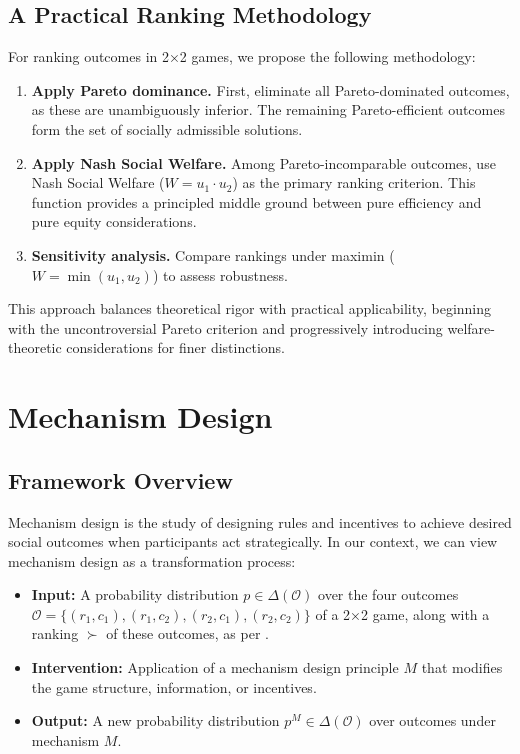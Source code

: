 \documentclass[11pt]{amsart}
\begin{document}
\subsection{A Practical Ranking Methodology} \label{method}

For ranking outcomes in 2×2 games, we propose the following methodology:

\begin{enumerate}
    \item \textbf{Apply Pareto dominance.} First, eliminate all Pareto-dominated outcomes, as these are unambiguously inferior. The remaining Pareto-efficient outcomes form the set of socially admissible solutions.
    
    \item \textbf{Apply Nash Social Welfare.} Among Pareto-incomparable outcomes, use Nash Social Welfare ($W = u_1 \cdot u_2$) as the primary ranking criterion. This function provides a principled middle ground between pure efficiency and pure equity considerations.
    
    \item \textbf{Sensitivity analysis.} Compare rankings under maximin ($W = \min(u_1, u_2)$) to assess robustness.
\end{enumerate}

This approach balances theoretical rigor with practical applicability, beginning with the uncontroversial Pareto criterion and progressively introducing welfare-theoretic considerations for finer distinctions.

\section{Mechanism Design}

\subsection{Framework Overview}

Mechanism design is the study of designing rules and incentives to achieve desired social outcomes when participants act strategically. In our context, we can view mechanism design as a transformation process:

\begin{itemize}
    \item \textbf{Input:} A probability distribution $p \in \Delta(\mathcal{O})$ over the four outcomes $\mathcal{O} = \{(r_1, c_1), (r_1, c_2), (r_2, c_1), (r_2, c_2)\}$ of a 2×2 game, along with a ranking $\succ$ of these outcomes, as per .
    
    \item \textbf{Intervention:} Application of a mechanism design principle $M$ that modifies the game structure, information, or incentives.
    
    \item \textbf{Output:} A new probability distribution $p^M \in \Delta(\mathcal{O})$ over outcomes under mechanism $M$.
\end{itemize}
\end{document}
